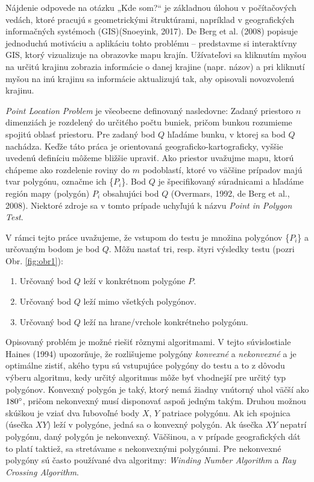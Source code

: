 \documentclass[11pt]{article}
\begin{document}
Nájdenie odpovede na otázku „Kde som?“ je základnou úlohou v počítačových vedách, ktoré pracujú s geometrickými štruktúrami, napríklad v geografických informačných systémoch (GIS)\linebreak (Snoeyink, 2017). De Berg et al. (2008) popisuje jednoduchú motiváciu a aplikáciu tohto \linebreak problému -- predstavme si interaktívny GIS, ktorý vizualizuje na obrazovke mapu krajín. Užívateľovi sa kliknutím myšou na určitú krajinu zobrazia informácie o danej krajine (napr. názov) a pri kliknutí myšou na inú krajinu sa informácie aktualizujú tak, aby opisovali novozvolenú krajinu.

\textit{Point Location Problem} je všeobecne definovaný nasledovne: Zadaný priestor\linebreak o $n$ dimenziách je rozdelený do určitého počtu buniek, pričom bunkou rozumieme spojitú oblasť priestoru. Pre zadaný bod $Q$ hľadáme bunku, v ktorej sa bod $Q$ nachádza. Keďže táto práca je orientovaná geograficko-kartograficky, vyššie uvedenú definíciu môžeme bližšie upraviť. Ako priestor uvažujme mapu, ktorú chápeme ako rozdelenie roviny do $m$ podoblastí, 
ktoré vo väčšine prípadov majú tvar polygónu, označme ich \{$P_i$\}. Bod $Q$ je špecifikovaný súradnicami a hľadáme región mapy (polygón) $P_i$ obsahujúci bod $Q$  (Overmars, 1992, 
de Berg et al., 2008). Niektoré zdroje sa v tomto prípade uchyľujú k názvu \textit{Point in Polygon Test}. 

V rámci tejto práce uvažujeme, že vstupom do testu je množina polygónov \{$P_i$\} a určovaným bodom je bod $Q$. Môžu nastať tri, resp. štyri výsledky testu (pozri Obr. \ref{fig:obr1}):
\begin{enumerate}[label=(\alph*),,leftmargin=1.59\parindent]
    \item Určovaný bod $Q$ leží v konkrétnom polygóne $P$.
    \item Určovaný bod $Q$ leží mimo všetkých polygónov.
    \item Určovaný bod $Q$ leží na hrane/vrchole konkrétneho polygónu.
\end{enumerate}

Opisovaný problém je možné riešiť rôznymi algoritmami. V tejto súvislosti\linebreak ale Haines (1994) upozorňuje, že rozlišujeme polygóny \textit{konvexné} a \textit{nekonvexné} a je optimálne zistiť, akého typu sú vstupujúce polygóny do testu a to z dôvodu výberu algoritmu, kedy určitý algoritmus môže byť vhodnejší pre určitý typ polygónov. Konvexný polygón je taký, ktorý nemá žiadny vnútorný uhol väčší ako $180 \degree$, pričom nekonvexný musí disponovať aspoň jedným takým. Druhou možnou skúškou je vziať dva ľubovoľné body $X$, $Y$ patriace polygónu. Ak ich spojnica (úsečka $XY$) leží v polygóne, jedná sa o konvexný polygón. Ak úsečka $XY$ nepatrí polygónu, daný polygón je nekonvexný. Väčšinou, a v prípade geografických dát to platí taktiež, sa stretávame s nekonvexnými polygónmi. Pre nekonvexné polygóny sú často používané dva algoritmy: \textit{Winding Number Algorithm} a \textit{Ray Crossing Algorithm}.
\end{document}
